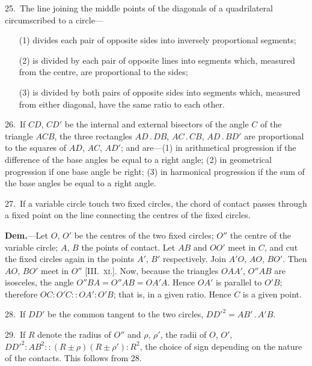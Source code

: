 \documentclass[oneside]{book}
\newcommand\imgcent[2]{
\begin{center}
\end{center}
}
\begin{document}
\begin{footnotesize}
25.~The line joining the middle points of the diagonals of a
quadrilateral circumscribed to a circle---
\begin{changemargin}{0.3in}{0in}
\begin{enumerate}
   \item[(1)] divides each pair of opposite sides into inversely proportional segments;
   \item[(2)] is divided by each pair of opposite lines into segments which, measured from the centre, are proportional to the sides;
   \item[(3)] is divided by both pairs of opposite sides into segments which, measured from either diagonal, have the same ratio to each other.
\end{enumerate}
\end{changemargin}

26.~If $CD$, $CD'$ be the internal and external bisectors of the
angle $C$ of the triangle $ACB$, the three rectangles $AD\,.\, DB$,
$AC\,.\, CB$, $AD\,.\, BD'$ are proportional to the squares of $AD$, $AC$,
$AD'$; and are---(1) in arithmetical progression if the difference of
the base angles be equal to a right angle; (2) in geometrical
progression if one base angle be right; (3) in harmonical
progression if the sum of the base angles be equal to a right angle.

27.~If a variable circle touch two fixed circles, the chord of
contact passes through a fixed point on the line connecting the
centres of the fixed circles.

\imgcent{304}{f213}

\textbf{Dem.}---Let $O$, $O'$ be the centres of the two fixed circles; $O''$
the centre of the variable circle; $A$, $B$ the points of contact. Let
$AB$ and $OO'$ meet in $C$, and cut the fixed circles again in the
points $A'$, $B'$ respectively. Join $A'O$, $AO$, $BO'$. Then $AO$, $BO'$
meet in $O''$ [III\@.~\textsc{xi.}]. Now, because the triangles $OAA'$, $O''AB$
are isosceles, the angle $O''BA = O''AB = OA'A$. Hence $OA'$ is
parallel to $O'B$; therefore $OC : O'C :: OA' : O'B$; that is, in a
given ratio. Hence $C$ is a given point.

28.~If $DD'$ be the common tangent to the two circles, $DD'^{2}
= AB' \,.\, A'B$.

29.~If $R$ denote the radius of $O''$ and $\rho$, $\rho'$, the radii of $O$, $O'$,
$DD'^{2} : AB^{2} :: (R \pm \rho)(R \pm \rho') : R^{2}$, the choice of sign depending
on the nature of the contacts. This follows from 28.


\end{footnotesize}
\end{document}
